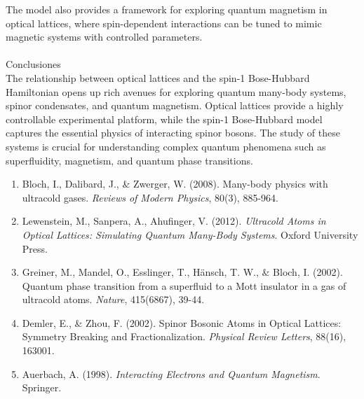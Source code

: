 The model also provides a framework for exploring quantum magnetism in optical lattices, where spin-dependent interactions can be tuned to mimic magnetic systems with controlled parameters. \\ \\
\textcolor{myred}{Conclusiones}\\
The relationship between optical lattices and the spin-1 Bose-Hubbard Hamiltonian opens up rich avenues for exploring quantum many-body systems, spinor condensates, and quantum magnetism. Optical lattices provide a highly controllable experimental platform, while the spin-1 Bose-Hubbard model captures the essential physics of interacting spinor bosons. The study of these systems is crucial for understanding complex quantum phenomena such as superfluidity, magnetism, and quantum phase transitions.


\begin{enumerate}
    \item Bloch, I., Dalibard, J., \& Zwerger, W. (2008). Many-body physics with ultracold gases. \textit{Reviews of Modern Physics}, 80(3), 885-964.
    \item Lewenstein, M., Sanpera, A., Ahufinger, V. (2012). \textit{Ultracold Atoms in Optical Lattices: Simulating Quantum Many-Body Systems}. Oxford University Press.
    \item Greiner, M., Mandel, O., Esslinger, T., Hänsch, T. W., \& Bloch, I. (2002). Quantum phase transition from a superfluid to a Mott insulator in a gas of ultracold atoms. \textit{Nature}, 415(6867), 39-44.
    \item Demler, E., \& Zhou, F. (2002). Spinor Bosonic Atoms in Optical Lattices: Symmetry Breaking and Fractionalization. \textit{Physical Review Letters}, 88(16), 163001.
    \item Auerbach, A. (1998). \textit{Interacting Electrons and Quantum Magnetism}. Springer.
\end{enumerate}
\newpage
